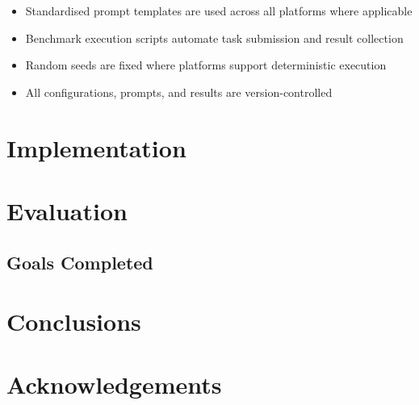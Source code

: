 \documentclass[]
{UCD_CS_FYP_Report}
\begin{document}
\begin{itemize}
  \item Standardised prompt templates are used across all platforms where applicable
  \item Benchmark execution scripts automate task submission and result collection
  \item Random seeds are fixed where platforms support deterministic execution
  \item All configurations, prompts, and results are version-controlled
\end{itemize}

\chapter{Implementation}
\chapter{Evaluation}
\section{Goals Completed}

\chapter{Conclusions}




\chapter*{Acknowledgements}




\printbibliography
\end{document}
